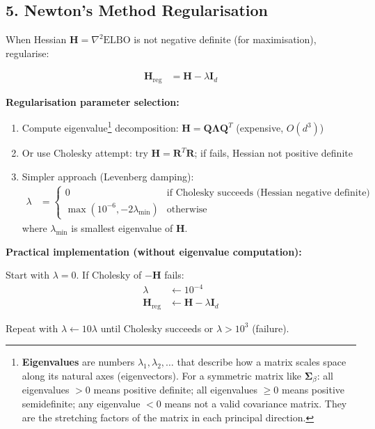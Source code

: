 \documentclass[11pt]{article}
\newcommand{\ELBO}{\text{ELBO}}
\begin{document}
\subsection*{5. Newton's Method Regularisation}

When Hessian $\bm{H} = \nabla^2 \ELBO$ is not negative definite (for maximisation), regularise:

\begin{align}
\bm{H}_{\text{reg}} &= \bm{H} - \lambda \bm{I}_d
\end{align}

\textbf{Regularisation parameter selection:}

\begin{enumerate}
\item Compute eigenvalue\footnote{\textbf{Eigenvalues} are numbers $\lambda_1, \lambda_2, \ldots$ that describe how a matrix scales space along its natural axes (eigenvectors). For a symmetric matrix like $\bm{\Sigma}_\beta$: all eigenvalues $> 0$ means positive definite; all eigenvalues $\geq 0$ means positive semidefinite; any eigenvalue $< 0$ means not a valid covariance matrix. They are the stretching factors of the matrix in each principal direction.} decomposition: $\bm{H} = \bm{Q} \bm{\Lambda} \bm{Q}^T$ (expensive, $O(d^3)$)
\item Or use Cholesky attempt: try $\bm{H} = \bm{R}^T \bm{R}$; if fails, Hessian not positive definite
\item Simpler approach (Levenberg damping):
\begin{align}
\lambda &= \begin{cases}
0 & \text{if Cholesky succeeds (Hessian negative definite)}\\
\max(10^{-6}, -2\lambda_{\min}) & \text{otherwise}
\end{cases}
\end{align}
where $\lambda_{\min}$ is smallest eigenvalue of $\bm{H}$.
\end{enumerate}

\textbf{Practical implementation (without eigenvalue computation):}

Start with $\lambda = 0$. If Cholesky of $-\bm{H}$ fails:
\begin{align}
\lambda &\leftarrow 10^{-4}\\
\bm{H}_{\text{reg}} &\leftarrow \bm{H} - \lambda \bm{I}_d
\end{align}

Repeat with $\lambda \leftarrow 10 \lambda$ until Cholesky succeeds or $\lambda > 10^{3}$ (failure).
\end{document}
